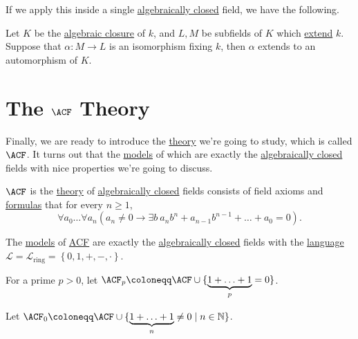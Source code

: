 If we apply this inside a single \hyperref[def:algebraically-closed]{algebraically closed} field, we have the following.

\begin{theorem}
	Let \(K\) be the \hyperref[def:algebraic-closure]{algebraic closure} of \(k\), and \(L, M\) be subfields of \(K\) which \hyperref[def:field-extension]{extend} \(k\). Suppose that \(\alpha \colon M \to L\) is an isomorphism fixing \(k\), then \(\alpha \) extends to an automorphism of \(K\).
\end{theorem}

\section{The \(\ACF\) Theory}
Finally, we are ready to introduce the \hyperref[def:theory]{theory} we're going to study, which is called \(\ACF\). It turns out that the \hyperref[def:model]{models} of which are exactly the \hyperref[def:algebraically-closed]{algebraically closed} fields with nice properties we're going to discuss.

\begin{definition}[\(\ACF\)]\label{def:ACF}
	\(\ACF\) is the \hyperref[def:theory]{theory} of \hyperref[def:algebraically-closed]{algebraically closed} fields consists of field axioms and \hyperref[def:formula]{formulas} that for every \(n \geq 1\),
	\[
		\forall a_0 \ldots \forall a_n \left( a_n \neq 0 \to \exists b\ a_n b^n + a_{n-1} b^{n-1} + \ldots + a_0 = 0\right) .
	\]
\end{definition}

\begin{remark}
	The \hyperref[def:model]{models} of \hyperref[def:ACF]{ACF} are exactly the \hyperref[def:algebraically-closed]{algebraically closed} fields with the \hyperref[def:language]{language} \(\mathcal{L} = \mathcal{L} _{\text{ring} } = \left\{ 0, 1, +, -, \cdot \right\} \).
\end{remark}

\begin{notation}[\(\ACF_p\)]
	For a prime \(p > 0\), let \(\ACF_p \coloneqq \ACF \cup \{\underbrace{1+\ldots +1}_{p} = 0\}\).
\end{notation}

\begin{notation}[\(\ACF_0\)]
	Let \(\ACF_0 \coloneqq \ACF \cup \{\underbrace{1+\ldots +1}_n \neq 0 \mid n\in \mathbb{N} \}\).
\end{notation}

